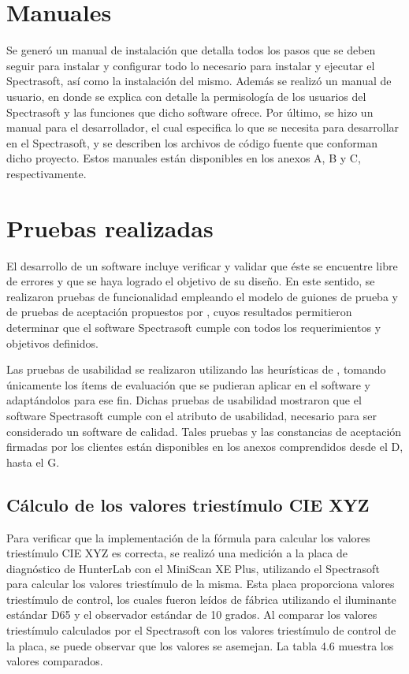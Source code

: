\newpage
\section{Manuales}
	Se gener\'{o} un manual de instalaci\'{o}n que detalla todos los pasos que se deben seguir para instalar y configurar todo lo necesario para instalar y ejecutar el Spectrasoft, as\'{i} como la instalaci\'{o}n del mismo. Adem\'{a}s se realiz\'{o} un manual de usuario, en donde se explica con detalle la permisolog\'{i}a de los usuarios del Spectrasoft y las funciones que dicho software ofrece. Por \'{u}ltimo, se hizo un manual para el desarrollador, el cual especifica lo que se necesita para desarrollar en el Spectrasoft, y se describen los archivos de c\'{o}digo fuente que conforman dicho proyecto. Estos manuales est\'{a}n disponibles en los anexos A, B y C, respectivamente.

\section{Pruebas realizadas}
	
	El desarrollo de un software incluye verificar y validar que \'{e}ste se encuentre libre de errores y que se haya logrado el objetivo de su dise\~{n}o. En este sentido, se realizaron pruebas de funcionalidad empleando el modelo de guiones de prueba y de pruebas de aceptaci\'{o}n propuestos por , cuyos resultados permitieron determinar que el software Spectrasoft cumple con todos los requerimientos y objetivos definidos.
	
	Las pruebas de usabilidad se realizaron utilizando las heur\'{i}sticas de , tomando \'{u}nicamente los \'{i}tems de evaluaci\'{o}n que se pudieran aplicar en el software y adapt\'{a}ndolos para ese fin. Dichas pruebas de usabilidad mostraron que el software Spectrasoft cumple con el atributo de usabilidad, necesario para ser considerado un software de calidad. Tales pruebas y las constancias de aceptaci\'{o}n firmadas por los clientes est\'{a}n disponibles en los anexos comprendidos desde el D, hasta el G.
	
	\subsection{C\'{a}lculo de los valores triest\'{i}mulo CIE XYZ}
	Para verificar que la implementaci\'{o}n de la f\'{o}rmula para calcular los valores triest\'{i}mulo CIE XYZ	es correcta, se realiz\'{o} una medici\'{o}n a la placa de diagn\'{o}stico de HunterLab con el MiniScan XE Plus, utilizando el Spectrasoft para calcular los valores triest\'{i}mulo de la misma. Esta placa proporciona valores triest\'{i}mulo de control, los cuales fueron le\'{i}dos de f\'{a}brica utilizando el iluminante est\'{a}ndar D65 y el observador est\'{a}ndar de 10 grados. Al comparar los valores triest\'{i}mulo calculados por el Spectrasoft con los valores triest\'{i}mulo de control de la placa, se puede observar que los valores se asemejan. La tabla 4.6 muestra los valores comparados.
	
